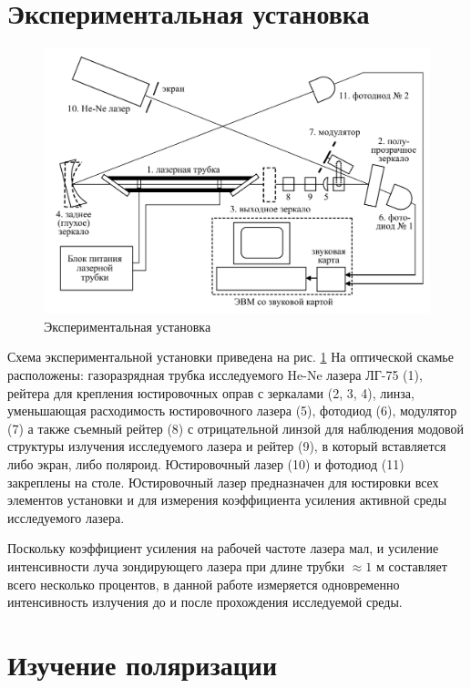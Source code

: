     \section*{Экспериментальная установка}
    
    \begin{figure}[h!]
    	\centering
    	\includegraphics[scale=0.7]{images/Установка.png}
    	\caption{Экспериментальная установка}
    	\label{image:installation}
    \end{figure}
    
    Схема экспериментальной установки приведена на рис. \ref{image:installation} На оптической скамье расположены: газоразрядная трубка исследуемого He-Ne лазера ЛГ-75 (1), рейтера для крепления юстировочных оправ с зеркалами (2, 3, 4), линза, уменьшающая расходимость юстировочного лазера (5), фотодиод (6), модулятор (7) а также съемный рейтер (8) с отрицательной линзой для наблюдения модовой структуры излучения исследуемого лазера и рейтер (9), в который вставляется либо экран, либо поляроид. Юстировочный лазер (10) и фотодиод (11) закреплены на столе. Юстировочный лазер предназначен для юстировки всех элементов установки и для измерения коэффициента усиления активной среды исследуемого лазера.
    
    Поскольку коэффициент усиления на рабочей частоте лазера мал, и усиление интенсивности луча зондирующего лазера при длине трубки $\approx 1$ м составляет всего несколько процентов, в данной работе измеряется одновременно интенсивность излучения до и после прохождения исследуемой среды.

    \section*{Изучение поляризации}
    
